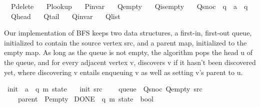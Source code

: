 \begin{isabellebody}
\ \ P{\isacharunderscore}{\kern0pt}delete\ \isanewline
\ \ P{\isacharunderscore}{\kern0pt}lookup\ \isanewline
\ \ P{\isacharunderscore}{\kern0pt}invar\ \isanewline
\ \ Q{\isacharunderscore}{\kern0pt}empty\ \isanewline
\ \ Q{\isacharunderscore}{\kern0pt}is{\isacharunderscore}{\kern0pt}empty\ \isanewline
\ \ Q{\isacharunderscore}{\kern0pt}snoc\ {\isacharcolon}{\kern0pt}{\isacharcolon}{\kern0pt}\ {\isachardoublequoteopen}{\isacharprime}{\kern0pt}q\ {\isasymRightarrow}\ {\isacharprime}{\kern0pt}a\ {\isasymRightarrow}\ {\isacharprime}{\kern0pt}q{\isachardoublequoteclose}\ \isanewline
\ \ Q{\isacharunderscore}{\kern0pt}head\ \isanewline
\ \ Q{\isacharunderscore}{\kern0pt}tail\ \isanewline
\ \ Q{\isacharunderscore}{\kern0pt}invar\ \isanewline
\ \ Q{\isacharunderscore}{\kern0pt}list\isanewline
{}%
\begin{isamarkuptext}%
Our implementation of BFS keeps two data structures, a first-in, first-out queue, initialized to
contain the source vertex src, and a parent map, initialized to the empty map. As long as the queue
is not empty, the algorithm pops the head u of the queue, and for every adjacent vertex v, discovers
v if it hasn't been discovered yet, where discovering v entails enqueuing v as well as setting v's
parent to u.%
\end{isamarkuptext}\isamarkuptrue%
\isamarkupfalse%
\ init\ {\isacharcolon}{\kern0pt}{\isacharcolon}{\kern0pt}\ {\isachardoublequoteopen}{\isacharprime}{\kern0pt}a\ {\isasymRightarrow}\ {\isacharparenleft}{\kern0pt}{\isacharprime}{\kern0pt}q{\isacharcomma}{\kern0pt}\ {\isacharprime}{\kern0pt}m{\isacharparenright}{\kern0pt}\ state{\isachardoublequoteclose}\ \isanewline
\ \ {\isachardoublequoteopen}init\ src\ {\isasymequiv}\isanewline
\ \ \ {\isasymlparr}queue\ {\isacharequal}{\kern0pt}\ Q{\isacharunderscore}{\kern0pt}snoc\ Q{\isacharunderscore}{\kern0pt}empty\ src{\isacharcomma}{\kern0pt}\isanewline
\ \ \ \ parent\ {\isacharequal}{\kern0pt}\ P{\isacharunderscore}{\kern0pt}empty{\isasymrparr}{\isachardoublequoteclose}\isanewline
\isanewline
{}\isamarkupfalse%
\ DONE\ {\isacharcolon}{\kern0pt}{\isacharcolon}{\kern0pt}\ {\isachardoublequoteopen}{\isacharparenleft}{\kern0pt}{\isacharprime}{\kern0pt}q{\isacharcomma}{\kern0pt}\ {\isacharprime}{\kern0pt}m{\isacharparenright}{\kern0pt}\ state\ {\isasymRightarrow}\ bool{\isachardoublequoteclose}\ \isanewline

\end{isabellebody}

